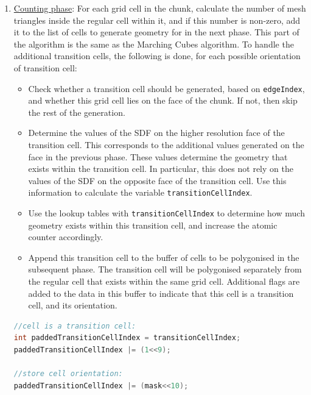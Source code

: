 \documentclass{article}
\begin{document}
\begin{enumerate}
\item \underline{Counting phase}: For each grid cell in the chunk, calculate the number of mesh triangles inside the regular cell within it, and if this number is non-zero, add it to the list of cells to generate geometry for in the next phase. This part of the algorithm is the same as the Marching Cubes algorithm. To handle the additional transition cells, the following is done, for each possible orientation of transition cell:
  \begin{itemize}
    \item Check whether a transition cell should be generated, based on \texttt{edgeIndex}, and whether this grid cell lies on the face of the chunk. If not, then skip the rest of the generation.
    \item Determine the values of the SDF on the higher resolution face of the transition cell. This corresponds to the additional values generated on the face in the previous phase. These values determine the geometry that exists within the transition cell. In particular, this does not rely on the values of the SDF on the opposite face of the transition cell. Use this information to calculate the variable \texttt{transitionCellIndex}.
    \item Use the lookup tables with \texttt{transitionCellIndex} to determine how much geometry exists within this transition cell, and increase the atomic counter accordingly.
    \item Append this transition cell to the buffer of cells to be polygonised in the subsequent phase. The transition cell will be polygonised separately from the regular cell that exists within the same grid cell. Additional flags are added to the data in this buffer to indicate that this cell is a transition cell, and its orientation.
  \end{itemize}
\begin{lstlisting}[language=C++,label={tv_count},caption={Part of the code responsible for counting the triangles in transition cells, and appending them to the geometry generation buffer. The first 9 bits of \texttt{paddedTransitionCellIndex} store the type of geometry inside the transition cell, the 10th bit records that the cell is a transition cell, and bits 11-16 are a mask identifying the orientation of the transition cell.}]
//cell is a transition cell:
int paddedTransitionCellIndex = transitionCellIndex;
paddedTransitionCellIndex |= (1<<9);

//store cell orientation:
paddedTransitionCellIndex |= (mask<<10);


\end{lstlisting}
\end{enumerate}
\end{document}
